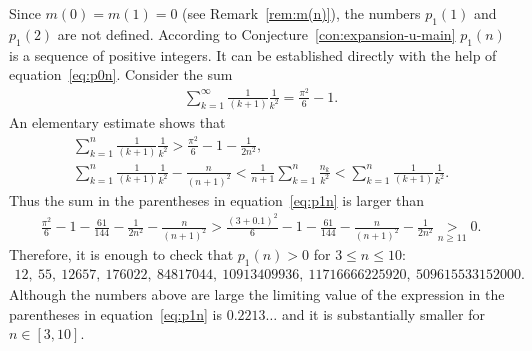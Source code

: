 \documentclass[pdftex]{sigma}
\numberwithin{equation}{section}
\begin{document}
\begin{Remark}\label{rem:p1n}
Since $m(0)=m(1)=0$ (see Remark~\ref{rem:m(n)}), the numbers $p_1(1)$ and $p_1(2)$ are not defined.
According to Conjecture~\ref{con:expansion-u-main} $p_1(n)$ is a sequence of positive integers. It can be established directly with the help of equation~\eqref{eq:p0n}.
Consider the sum
\begin{gather*}
\sum\limits_{k=1}^{\infty}\frac{1}{(k+1)} \frac{1}{k^2}=\frac{\pi^2}{6}-1.
\end{gather*}
An elementary estimate shows that
\begin{gather*}
\sum\limits_{k=1}^{n}\frac{1}{(k+1)} \frac{1}{k^2}>\frac{\pi^2}{6}-1-\frac{1}{2n^2},\\
\sum\limits_{k=1}^{n}\frac{1}{(k+1)} \frac{1}{k^2}-\frac{n}{(n+1)^2}<\frac{1}{n+1}\sum\limits_{k=1}^n\frac{n_k}{k^2}
<\sum\limits_{k=1}^{n}\frac{1}{(k+1)} \frac{1}{k^2}.
\end{gather*}
Thus the sum in the parentheses in equation~\eqref{eq:p1n} is larger than
\begin{gather*}
\frac{\pi^2}{6}-1-\frac{61}{144}-\frac{1}{2n^2}-\frac{n}{(n+1)^2}>
\frac{(3+0.1)^2}{6}-1-\frac{61}{144}-\frac{n}{(n+1)^2}-\frac{1}{2n^2}\underset{n\geq11}{>}0.
\end{gather*}
Therefore, it is enough to check that $p_1(n)>0$ for $3\leq n\leq10$:
\begin{gather*}
12, \ 55, \ 12657, \ 176022, \ 84817044, \ 10913409936, \ 11716666225920, \ 509615533152000.
\end{gather*}
Although the numbers above are large the limiting value of the expression in the parentheses in equation~\eqref{eq:p1n}
is $0.2213\ldots$ and it is substantially smaller for $n\in[3,10]$.
\end{Remark}
\end{document}
